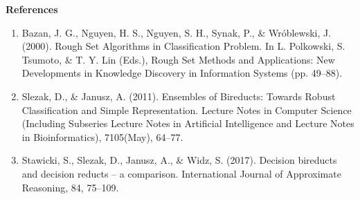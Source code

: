 \documentclass{letter}
\begin{document}
\textbf{References}
\begin{enumerate}
	\item Bazan, J. G., Nguyen, H. S., Nguyen, S. H., Synak, P., \& Wróblewski, J. (2000). Rough Set Algorithms in Classification Problem. In L. Polkowski, S. Tsumoto, \& T. Y. Lin (Eds.), Rough Set Methods and Applications: New Developments in Knowledge Discovery in Information Systems (pp. 49--88).
	
	\item Slezak, D., \& Janusz, A. (2011). Ensembles of Bireducts: Towards Robust Classification and Simple Representation. Lecture Notes in Computer Science (Including Subseries Lecture Notes in Artificial Intelligence and Lecture Notes in Bioinformatics), 7105(May), 64--77.
	
	\item Stawicki, S., Slezak, D., Janusz, A., \& Widz, S. (2017). Decision bireducts and decision reducts -- a comparison. International Journal of Approximate Reasoning, 84, 75--109.
\end{enumerate}
	
	

	
\end{document}
